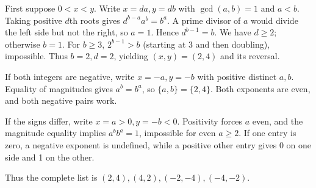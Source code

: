 First suppose $0<x<y$. Write $x=da,y=db$ with $\gcd(a,b)=1$ and $a<b$. Taking positive $d$th roots gives $d^{b-a}a^b=b^a$. A prime divisor of $a$ would divide the left side but not the right, so $a=1$. Hence $d^{b-1}=b$. We have $d\ge2$; otherwise $b=1$. For $b\ge3$, $2^{b-1}>b$ (starting at 3 and then doubling), impossible. Thus $b=2,d=2$, yielding $(x,y)=(2,4)$ and its reversal.

If both integers are negative, write $x=-a,y=-b$ with positive distinct $a,b$. Equality of magnitudes gives $a^b=b^a$, so $\{a,b\}=\{2,4\}$. Both exponents are even, and both negative pairs work.

If the signs differ, write $x=a>0,y=-b<0$. Positivity forces $a$ even, and the magnitude equality implies $a^b b^a=1$, impossible for even $a\ge2$. If one entry is zero, a negative exponent is undefined, while a positive other entry gives 0 on one side and 1 on the other.

Thus the complete list is $\boxed{(2,4),(4,2),(-2,-4),(-4,-2)}$.
